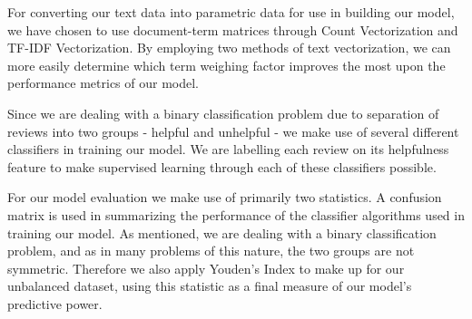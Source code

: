 \documentclass[twoside,twocolumn]{article}
\begin{document}
For converting our text data into parametric data for use in building our model, we have chosen to use document-term matrices through Count Vectorization and TF-IDF Vectorization. By employing two methods of text vectorization, we can more easily determine which term weighing factor improves the most upon the performance metrics of our model.

Since we are dealing with a binary classification problem due to separation of reviews into two groups - helpful and unhelpful - we make use of several different classifiers in training our model. We are labelling each review on its helpfulness feature to make supervised learning through each of these classifiers possible.

For our model evaluation we make use of primarily two statistics. A confusion matrix is used in summarizing the performance of the classifier algorithms used in training our model. As mentioned, we are dealing with a binary classification problem, and as in many problems of this nature, the two groups are not symmetric. Therefore we also apply Youden's Index to make up for our unbalanced dataset, using this statistic as a final measure of our model's predictive power.

\end{document}
